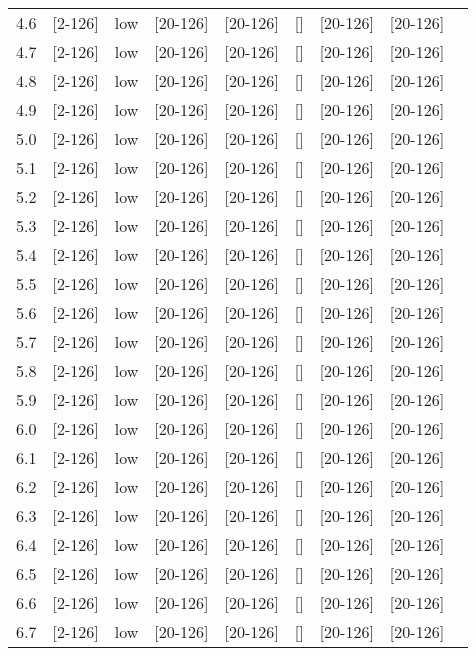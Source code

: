 \documentclass{article}
\begin{document}
\begin{tabular}{| l | l | l | l | l | l | l | l | l |}
      4.6 & [2-126] & low & [20-126] & [20-126] & [] & [20-126] & [20-126] &\\
      4.7 & [2-126] & low & [20-126] & [20-126] & [] & [20-126] & [20-126] &\\
      4.8 & [2-126] & low & [20-126] & [20-126] & [] & [20-126] & [20-126] &\\
      4.9 & [2-126] & low & [20-126] & [20-126] & [] & [20-126] & [20-126] &\\
      5.0 & [2-126] & low & [20-126] & [20-126] & [] & [20-126] & [20-126] &\\
      5.1 & [2-126] & low & [20-126] & [20-126] & [] & [20-126] & [20-126] &\\
      5.2 & [2-126] & low & [20-126] & [20-126] & [] & [20-126] & [20-126] &\\
      5.3 & [2-126] & low & [20-126] & [20-126] & [] & [20-126] & [20-126] &\\
      5.4 & [2-126] & low & [20-126] & [20-126] & [] & [20-126] & [20-126] &\\
      5.5 & [2-126] & low & [20-126] & [20-126] & [] & [20-126] & [20-126] &\\
      5.6 & [2-126] & low & [20-126] & [20-126] & [] & [20-126] & [20-126] &\\
      5.7 & [2-126] & low & [20-126] & [20-126] & [] & [20-126] & [20-126] &\\
      5.8 & [2-126] & low & [20-126] & [20-126] & [] & [20-126] & [20-126] &\\
      5.9 & [2-126] & low & [20-126] & [20-126] & [] & [20-126] & [20-126] &\\
      6.0 & [2-126] & low & [20-126] & [20-126] & [] & [20-126] & [20-126] &\\
      6.1 & [2-126] & low & [20-126] & [20-126] & [] & [20-126] & [20-126] &\\
      6.2 & [2-126] & low & [20-126] & [20-126] & [] & [20-126] & [20-126] &\\
      6.3 & [2-126] & low & [20-126] & [20-126] & [] & [20-126] & [20-126] &\\
      6.4 & [2-126] & low & [20-126] & [20-126] & [] & [20-126] & [20-126] &\\
      6.5 & [2-126] & low & [20-126] & [20-126] & [] & [20-126] & [20-126] &\\
      6.6 & [2-126] & low & [20-126] & [20-126] & [] & [20-126] & [20-126] &\\
      6.7 & [2-126] & low & [20-126] & [20-126] & [] & [20-126] & [20-126] &\\

\end{tabular}
\end{document}
